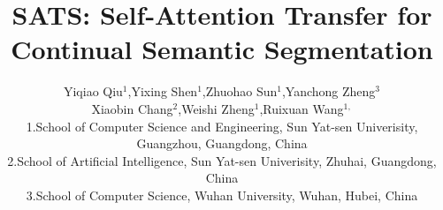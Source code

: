 \documentclass[onecolumn,conference,compsoc]{IEEEtran}
\begin{document}
\title{SATS: Self-Attention Transfer for Continual Semantic Segmentation}



\author{
Yiqiao Qiu$^{1}$,Yixing Shen$^{1}$,Zhuohao Sun$^{1}$,Yanchong Zheng$^{3}$\\
Xiaobin Chang$^{2}$,Weishi Zheng$^{1}$,Ruixuan Wang$^{1,}$\textsuperscript{\Envelope}\\
\small{1.School of Computer Science and Engineering, Sun Yat-sen Univerisity, Guangzhou, Guangdong, China}\\
\small{2.School of Artificial Intelligence, Sun Yat-sen Univerisity, Zhuhai, Guangdong, China}\\
\small{3.School of Computer Science, Wuhan University, Wuhan, Hubei, China}
}

\maketitle



\pagestyle{plain}
\thispagestyle{plain}
\end{document}
